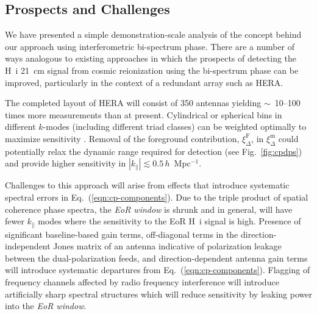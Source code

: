 \documentclass[
reprint,
superscriptaddress,
amsmath,
amssymb,
aps,
prd
]{revtex4-1}
\begin{document}
\subsection{Prospects and Challenges}\label{sec:prospects-challenges}


We have presented a simple demonstration-scale analysis of the concept behind our approach using interferometric bi-spectrum phase. There are a number of ways analogous to existing approaches in which the prospects of detecting the H~{\sc i} 21~cm signal from cosmic reionization using the bi-spectrum phase can be improved, particularly in the context of a redundant array such as HERA. 

The completed layout of HERA will consist of 350 antennas yielding $\sim$~10--100 times more measurements than at present. Cylindrical or spherical bins in different $k$-modes (including different triad classes) can be weighted optimally to maximize sensitivity \cite{liu14a,liu14b,dil15}. Removal of the foreground contribution, $\xi_\Delta^\textrm{F}$, in $\xi_\Delta^\textrm{m}$ could potentially relax the dynamic range required for detection (see Fig.~\ref{fig:cpdps}) and provide higher sensitivity in $|k_\parallel| \lesssim 0.5\,h$~Mpc$^{-1}$.

Challenges to this approach will arise from effects that introduce systematic spectral errors in Eq.~(\ref{eqn:cp-components}). Due to the triple product of spatial coherence phase spectra, the {\it EoR window} is shrunk and in general, will have fewer $k_\parallel$ modes where the sensitivity to the EoR H~{\sc i} signal is high. Presence of significant baseline-based gain terms, off-diagonal terms in the direction-independent Jones matrix of an antenna indicative of polarization leakage between the dual-polarization feeds, and direction-dependent antenna gain terms will introduce systematic departures from Eq.~(\ref{eqn:cp-components}). Flagging of frequency channels affected by radio frequency interference will introduce artificially sharp spectral structures which will reduce sensitivity by leaking power into the {\it EoR window}.
\end{document}
